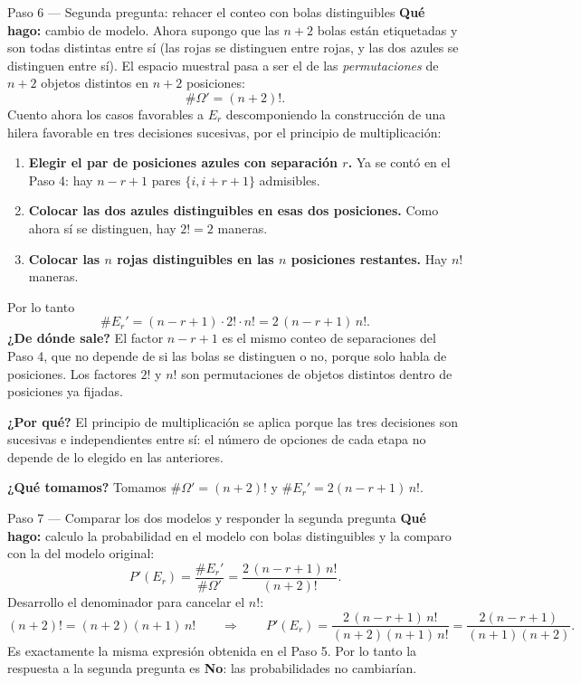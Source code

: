 \documentclass[11pt]{article}
\begin{document}
\begin{sol}
\begin{paso}{Paso 6 --- Segunda pregunta: rehacer el conteo con bolas distinguibles}
\textbf{Qué hago:} cambio de modelo. Ahora supongo que las $n+2$ bolas están etiquetadas y son
todas distintas entre sí (las rojas se distinguen entre rojas, y las dos azules se distinguen
entre sí). El espacio muestral pasa a ser el de las \emph{permutaciones} de $n+2$ objetos
distintos en $n+2$ posiciones:
\[
\#\Omega'=(n+2)! .
\]
Cuento ahora los casos favorables a $E_r$ descomponiendo la construcción de una hilera
favorable en tres decisiones sucesivas, por el principio de multiplicación:
\begin{enumerate}[leftmargin=*]
  \item \textbf{Elegir el par de posiciones azules con separación $r$.} Ya se contó en el
        Paso 4: hay $n-r+1$ pares $\{i,i+r+1\}$ admisibles.
  \item \textbf{Colocar las dos azules distinguibles en esas dos posiciones.} Como ahora sí se
        distinguen, hay $2!=2$ maneras.
  \item \textbf{Colocar las $n$ rojas distinguibles en las $n$ posiciones restantes.} Hay
        $n!$ maneras.
\end{enumerate}
Por lo tanto
\[
\#E_r'=(n-r+1)\cdot 2!\cdot n!=2\,(n-r+1)\,n! .
\]
\textbf{¿De dónde sale?} El factor $n-r+1$ es el mismo conteo de separaciones del Paso 4, que
no depende de si las bolas se distinguen o no, porque solo habla de posiciones. Los factores
$2!$ y $n!$ son permutaciones de objetos distintos dentro de posiciones ya fijadas.

\textbf{¿Por qué?} El principio de multiplicación se aplica porque las tres decisiones son
sucesivas e independientes entre sí: el número de opciones de cada etapa no depende de lo
elegido en las anteriores.

\textbf{¿Qué tomamos?} Tomamos $\#\Omega'=(n+2)!$ y $\#E_r'=2(n-r+1)\,n!$.
\end{paso}

\begin{paso}{Paso 7 --- Comparar los dos modelos y responder la segunda pregunta}
\textbf{Qué hago:} calculo la probabilidad en el modelo con bolas distinguibles y la comparo
con la del modelo original:
\[
P'(E_r)=\frac{\#E_r'}{\#\Omega'}=\frac{2\,(n-r+1)\,n!}{(n+2)!} .
\]
Desarrollo el denominador para cancelar el $n!$:
\[
(n+2)!=(n+2)(n+1)\,n!
\qquad\Longrightarrow\qquad
P'(E_r)=\frac{2\,(n-r+1)\,n!}{(n+2)(n+1)\,n!}=\frac{2(n-r+1)}{(n+1)(n+2)} .
\]
Es exactamente la misma expresión obtenida en el Paso 5. Por lo tanto la respuesta a la
segunda pregunta es \textbf{No}: las probabilidades no cambiarían.


\end{paso}
\end{sol}
\end{document}
